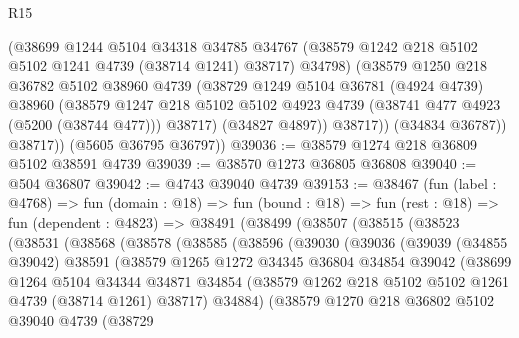 \begin{lexlean}{R15}
\begin{coremodule}
{{{{{{{{{{{              (@38699
                @1244
                @5104
                @34318
                @34785
                @34767
                (@38579 @1242 @218 @5102 @5102 @1241 @4739 (@38714 @1241) @38717)
                @34798)
              (@38579
                @1250
                @218
                @36782
                @5102
                @38960
                @4739
                (@38729
                  @1249
                  @5104
                  @36781
                  (@4924 @4739)
                  @38960
                  (@38579
                    @1247
                    @218
                    @5102
                    @5102
                    @4923
                    @4739
                    (@38741 @477 @4923 (@5200 (@38744 @477)))
                    @38717)
                  (@34827 @4897))
                @38717))
            (@34834 @36787))
          @38717))
      (@5605 @36795 @36797))
@39036 := @38579 @1274 @218 @36809 @5102 @38591 @4739
@39039 := @38570 @1273 @36805 @36808
@39040 := @504 @36807
@39042 := @4743 @39040 @4739
@39153 := @38467
    (fun (label : @4768) =>
    fun (domain : @18) =>
    fun (bound : @18) =>
    fun (rest : @18) =>
    fun (dependent : @4823) =>
    @38491
      (@38499
        (@38507
          (@38515
            (@38523
              (@38531
                (@38568
                  (@38578
                    (@38585
                      (@38596
                        (@39030
                          (@39036
                            (@39039
                              (@34855 @39042)
                              @38591
                              (@38579
                                @1265
                                @1272
                                @34345
                                @36804
                                @34854
                                @39042
                                (@38699
                                  @1264
                                  @5104
                                  @34344
                                  @34871
                                  @34854
                                  (@38579 @1262 @218 @5102 @5102 @1261 @4739 (@38714 @1261) @38717)
                                  @34884)
                                (@38579
                                  @1270
                                  @218
                                  @36802
                                  @5102
                                  @39040
                                  @4739
                                  (@38729
}}}}}}}}}}}
\end{coremodule}
\end{lexlean}
